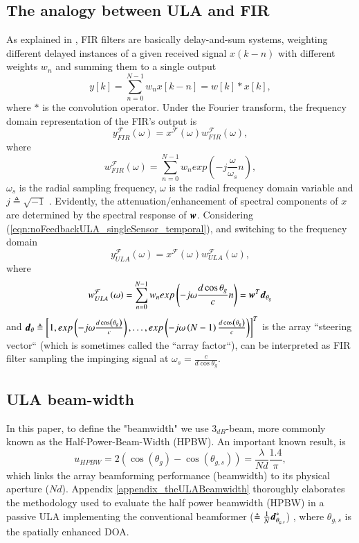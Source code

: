 \subsection*{The analogy between ULA and FIR}
\label{subsec_ULAFIR_analogy}
As explained in \cite{VanVeenBeamforming:Filtering}, FIR filters are basically delay-and-sum systems, weighting different delayed instances of a given received signal $x\left(k-n\right)$ with different weights $w_{n}$ and summing them to a single output $$y\left[k\right] = \sum_{n=0}^{N-1}w_{n}x\left[k-n\right] = w\left[k\right]*x\left[k\right],$$ where $*$ is the convolution operator. 
Under the Fourier transform, the frequency domain representation of the FIR's output is $$y_{FIR}^{\mathcal{F}}\left(\omega\right) = x^{\mathcal{F}}\left(\omega\right)w_{FIR}^{\mathcal{F}}\left(\omega\right),$$ where $$ w_{FIR}^{\mathcal{F}}\left(\omega\right) = \sum_{n=0}^{N-1}w_{n}exp\left(-j{}\frac{\omega}{\omega_{s}}n\right),$$ $\omega_{s}$ is the radial sampling frequency, $\omega$ is the radial frequency domain variable and $j \triangleq \sqrt{-1}$ .
Evidently, the attenuation/enhancement of spectral components of $x$ are determined by the spectral response of $\boldsymbol{w}$. 
Considering (\ref{eqn:noFeedbackULA_singleSensor_temporal}), and switching to the frequency domain $$ y_{ULA}^{\mathcal{F}}\left(\omega\right) = x^{\mathcal{F}}\left(\omega\right)w_{ULA}^{\mathcal{F}}\left(\omega\right),$$ where $$ 
w_{ULA}^{\mathcal{F}}\left(\omega\right) = \sum_{n=0}^{N-1}w_{n}exp\left(-j\omega\frac{d\cos{\theta_{g}}}{c}n\right) = \boldsymbol{w}^{T}\boldsymbol{d}_{\theta_{g}} $$ and $\boldsymbol{d}_{\theta} \triangleq \left[1,  exp\left(-j\omega\frac{d\cos\left(\theta_{g}\right)}{c}\right),\hdots,exp\left(-j\omega\left(N-1\right)\frac{d\cos\left(\theta_{g}\right)}{c}\right)\right]^{T} $ is the array ``steering vector`` (which is sometimes called the ``array factor``), can be interpreted as FIR filter sampling the impinging signal at $\omega_{s} = \frac{c}{d\cos{\theta_{g}}}$.
\subsection*{ULA beam-width}
\label{section_arrayPerformance_classicULA}
In this paper, to define the "beamwidth" we use $3_{dB}$-beam, more commonly known as the Half-Power-Beam-Width (HPBW). An important known \cite{VanTrees2002DetectionIV} result, is 
$$
u_{HPBW} = 2\left(\cos\left(\theta_{g}\right)-\cos\left(\theta_{g,s}\right)\right) = \frac{\lambda}{Nd}\frac{1.4}{\pi},
$$
which links the array beamforming performance (beamwidth) to its physical aperture ($Nd$). 
Appendix \ref{appendix_theULABeamwidth} thoroughly elaborates the methodology used to evaluate the half power beamwidth (HPBW) in a passive ULA implementing the conventional beamformer ($\triangleq \frac{1}{N}\boldsymbol{d}_{\theta_{g,s}}^{*}$) \cite{VanTrees2002DetectionIV}, where $\theta_{g,s}$ is the spatially enhanced DOA.